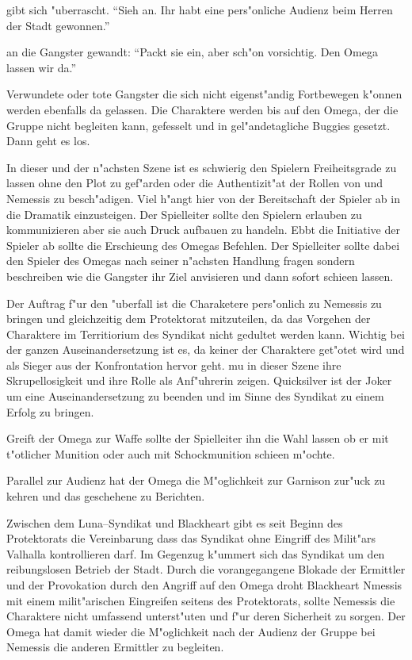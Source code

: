 \xlsn{} gibt sich "uberrascht. "`Sieh an. Ihr habt eine pers"onliche Audienz beim Herren der Stadt gewonnen."'

\xlsn{} an die Gangster gewandt: "`Packt sie ein, aber sch"on vorsichtig. Den Omega lassen wir da."'

Verwundete oder tote Gangster die sich nicht eigenst"andig Fortbewegen k"onnen werden ebenfalls da gelassen. Die Charaktere werden bis auf den Omega, der die Gruppe nicht begleiten kann, gefesselt und in gel"andetagliche Buggies gesetzt. Dann geht es los.

\begin{remarks}
	In dieser und der n"achsten Szene ist es schwierig den Spielern Freiheitsgrade zu lassen ohne den Plot zu gef"arden oder die Authentizit"at der Rollen von \xl{} und Nemessis zu besch"adigen. Viel h"angt hier von der Bereitschaft der Spieler ab in die Dramatik einzusteigen. Der Spielleiter sollte den Spielern erlauben zu kommunizieren aber sie auch Druck aufbauen zu handeln. Ebbt die Initiative der Spieler ab sollte \xl{} die Erschie\3ung des Omegas Befehlen. Der Spielleiter sollte dabei den Spieler des Omegas nach seiner n"achsten Handlung fragen sondern beschreiben wie die Gangster ihr Ziel anvisieren und dann sofort schie\3en lassen.

	Der Auftrag f"ur den "uberfall ist die Charaketere pers"onlich zu Nemessis zu bringen und gleichzeitig dem Protektorat mitzuteilen, da\3 das Vorgehen der Charaktere im Territiorium des Syndikat nicht gedultet werden kann. Wichtig bei der ganzen Auseinandersetzung ist es, da\3 keiner der Charaktere get"otet wird und \xl{} als Sieger aus der Konfrontation hervor geht. \xl{} mu\3 in dieser Szene ihre Skrupellosigkeit und ihre Rolle als Anf"uhrerin zeigen. Quicksilver ist der Joker um eine Auseinandersetzung zu beenden und im Sinne des Syndikat zu einem Erfolg zu bringen.

	Greift der Omega zur Waffe sollte der Spielleiter ihn die Wahl lassen ob er mit t"otlicher Munition oder auch mit Schockmunition schie\3en m"ochte.
\end{remarks}



Parallel zur Audienz hat der Omega die M"oglichkeit zur Garnison zur"uck zu kehren und das geschehene zu Berichten. 

Zwischen dem Luna--Syndikat und Blackheart gibt es seit Beginn des Protektorats die Vereinbarung dass das Syndikat ohne Eingriff des Milit"ars Valhalla kontrollieren darf. Im Gegenzug k"ummert sich das Syndikat um den reibungslosen Betrieb der Stadt. Durch die  vorangegangene Blokade der Ermittler und der Provokation durch den Angriff auf den Omega droht Blackheart Nmessis mit einem milit"arischen Eingreifen seitens des Protektorats, sollte Nemessis die Charaktere nicht umfassend unterst"uten und f"ur deren Sicherheit zu sorgen. Der Omega hat damit wieder die M"oglichkeit nach der Audienz der Gruppe bei Nemessis die anderen Ermittler zu begleiten.



